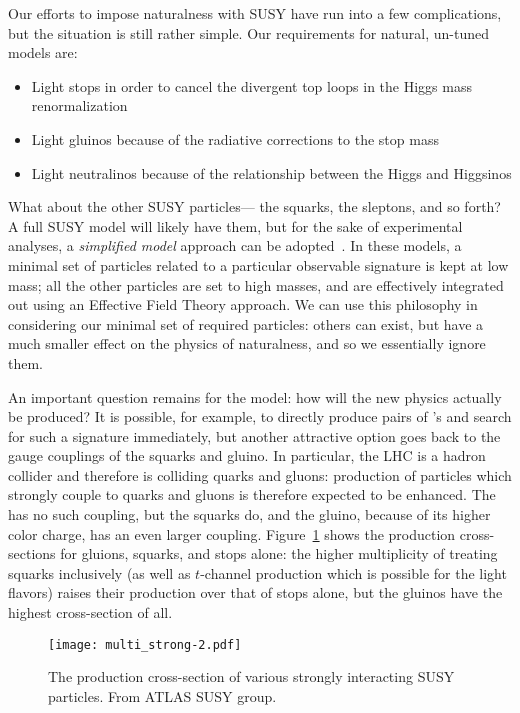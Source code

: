 Our efforts to impose naturalness with SUSY have run into a few complications, but the situation is still rather simple. Our requirements for natural, un-tuned models are:
%
\begin{itemize}
\item Light stops in order to cancel the divergent top loops in the Higgs mass renormalization
\item Light gluinos because of the radiative corrections to the stop mass
\item Light neutralinos because of the relationship between the Higgs and Higgsinos
\end{itemize}
%
What about the other SUSY particles--- the squarks, the sleptons, and so forth? A full SUSY model will likely have them, but for the sake of experimental analyses, a \textit{simplified model} approach can be adopted~\cite{simplified}. In these models, a minimal set of particles related to a particular observable signature is kept at low mass; all the other particles are set to high masses, and are effectively integrated out using an Effective Field Theory approach. We can use this philosophy in considering our minimal set of required particles: others can exist, but have a much smaller effect on the physics of naturalness, and so we essentially ignore them.


An important question remains for the model: how will the new physics actually be produced? It is possible, for example, to directly produce pairs of \lsp's and search for such a signature immediately, but another attractive option goes back to the gauge couplings of the squarks and gluino. In particular, the LHC is a hadron collider and therefore is colliding quarks and gluons: production of particles which strongly couple to quarks and gluons is therefore expected to be enhanced. The \lsp has no such coupling, but the squarks do, and the gluino, because of its higher color charge, has an even larger coupling. Figure~\ref{fig:susy:multi_strong} shows the production cross-sections for gluions, squarks, and stops alone: the higher multiplicity of treating squarks inclusively (as well as $t$-channel production which is possible for the light flavors) raises their production over that of stops alone, but the gluinos have the highest cross-section of all. 


\begin{figure}
\centering
\texttt{[image: multi\_strong-2.pdf]}
\caption{The production cross-section of various strongly interacting SUSY particles. From ATLAS SUSY group.}
\label{fig:susy:multi_strong}
\end{figure}

